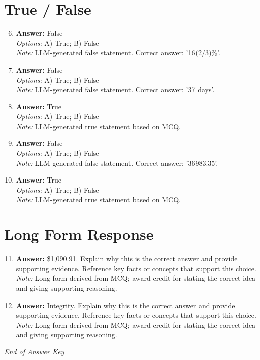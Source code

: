 \documentclass[12pt]{article}
\begin{document}
\section*{True / False}
\begin{enumerate}[label=\arabic*.]
\setcounter{enumi}{5}
\item \textbf{Answer:} False
\\ \textit{Options:} A) True; B) False
\\ \textit{Note:} LLM-generated false statement. Correct answer: '16(2/3)\%'.
\item \textbf{Answer:} False
\\ \textit{Options:} A) True; B) False
\\ \textit{Note:} LLM-generated false statement. Correct answer: '37 days'.
\item \textbf{Answer:} True
\\ \textit{Options:} A) True; B) False
\\ \textit{Note:} LLM-generated true statement based on MCQ.
\item \textbf{Answer:} False
\\ \textit{Options:} A) True; B) False
\\ \textit{Note:} LLM-generated false statement. Correct answer: '36983.35'.
\item \textbf{Answer:} True
\\ \textit{Options:} A) True; B) False
\\ \textit{Note:} LLM-generated true statement based on MCQ.
\end{enumerate}

\section*{Long Form Response}
\begin{enumerate}[label=\arabic*.]
\setcounter{enumi}{10}
\item \textbf{Answer:} \$1,090.91. Explain why this is the correct answer and provide supporting evidence. Reference key facts or concepts that support this choice.
\\ \textit{Note:} Long-form derived from MCQ; award credit for stating the correct idea and giving supporting reasoning.
\item \textbf{Answer:} Integrity. Explain why this is the correct answer and provide supporting evidence. Reference key facts or concepts that support this choice.
\\ \textit{Note:} Long-form derived from MCQ; award credit for stating the correct idea and giving supporting reasoning.
\end{enumerate}

\vfill
\noindent\textit{End of Answer Key}
\end{document}
